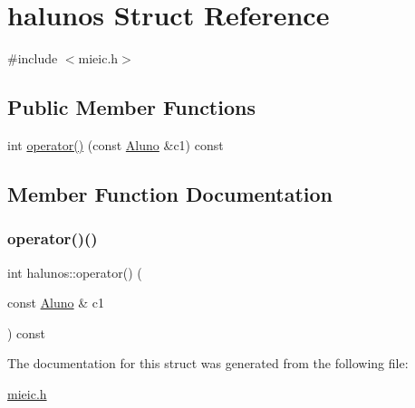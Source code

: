 \hypertarget{structhalunos}{}\section{halunos Struct Reference}
\label{structhalunos}


{\ttfamily \#include $<$mieic.\+h$>$}

\subsection*{Public Member Functions}
\begin{DoxyCompactItemize}
\item 
int \hyperlink{structhalunos_a29870c143b0b05e14934a3b7d5b04140}{operator()} (const \hyperlink{class_aluno}{Aluno} \&c1) const
\end{DoxyCompactItemize}


\subsection{Member Function Documentation}
\hypertarget{structhalunos_a29870c143b0b05e14934a3b7d5b04140}{}\label{structhalunos_a29870c143b0b05e14934a3b7d5b04140} 
\subsubsection{\texorpdfstring{operator()()}{operator()()}}
{\footnotesize\ttfamily int halunos\+::operator() (\begin{DoxyParamCaption}\item[{const \hyperlink{class_aluno}{Aluno} \&}]{c1 }\end{DoxyParamCaption}) const\hspace{0.3cm}{\ttfamily [inline]}}



The documentation for this struct was generated from the following file\+:\begin{DoxyCompactItemize}
\item 
\hyperlink{mieic_8h}{mieic.\+h}\end{DoxyCompactItemize}
